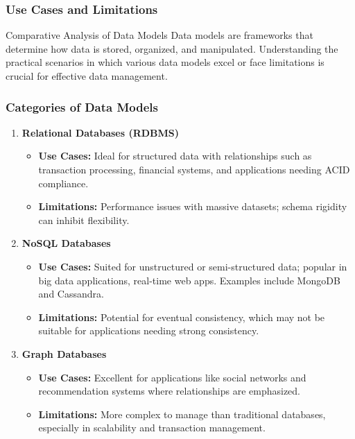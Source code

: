 \documentclass[aspectratio=169]{beamer}
\begin{document}
\begin{frame}[fragile]
    \frametitle{Use Cases and Limitations}
    \begin{block}{Comparative Analysis of Data Models}
        Data models are frameworks that determine how data is stored, organized, and manipulated. Understanding the practical scenarios in which various data models excel or face limitations is crucial for effective data management.
    \end{block}
\end{frame}

\begin{frame}[fragile]
    \frametitle{Categories of Data Models}
    \begin{enumerate}
        \item \textbf{Relational Databases (RDBMS)}
            \begin{itemize}
                \item \textbf{Use Cases:} Ideal for structured data with relationships such as transaction processing, financial systems, and applications needing ACID compliance.
                \item \textbf{Limitations:} Performance issues with massive datasets; schema rigidity can inhibit flexibility.
            \end{itemize}
        
        \item \textbf{NoSQL Databases}
            \begin{itemize}
                \item \textbf{Use Cases:} Suited for unstructured or semi-structured data; popular in big data applications, real-time web apps. Examples include MongoDB and Cassandra.
                \item \textbf{Limitations:} Potential for eventual consistency, which may not be suitable for applications needing strong consistency.
            \end{itemize}
        
        \item \textbf{Graph Databases}
            \begin{itemize}
                \item \textbf{Use Cases:} Excellent for applications like social networks and recommendation systems where relationships are emphasized.
                \item \textbf{Limitations:} More complex to manage than traditional databases, especially in scalability and transaction management.
            \end{itemize}
    \end{enumerate}
\end{frame}
\end{document}
